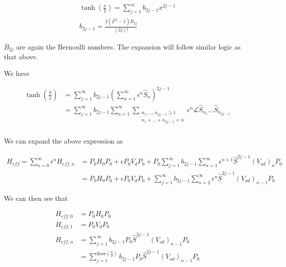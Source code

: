 \documentclass[12pt]{article}
\begin{document}
\begin{equation}
\begin{split}
\tanh\left(\frac{x}{2}\right) = \sum_{j=1}^{\infty} b_{2j-1} x^{2j-1}\\
b_{2j-1} = \frac{2(2^{2j}-1)B_{2j}}{(2j)!}
\end{split}
\end{equation}

$B_{2j}$ are again the Bernoulli numbers. The expansion will follow similar logic as that above.

We have

\begin{equation}
\begin{split}
\tanh\left(\frac{\hat{S}}{2}\right) &= \sum_{j=1}^{\infty} b_{2j-1}\left(\sum_{n=1}^{\infty} \epsilon^n\hat{S}_n \right)^{2j-1}\\
&=\sum_{j=1}^{\infty}b_{2j-1} \sum_{n=1}^{\infty}\sum_{\substack{n_1,\ldots,n_{2j-1}\ge 1\\n_1+\ldots+n_{2j-1}=n}}\epsilon^n \mathcal{L}\hat{S}_{n_1}\ldots \hat{S}_{n_{2j-1}}\\
\end{split}
\end{equation}

We can expand the above expression as

\begin{equation}
\begin{split}
H_{eff} = \sum_{n=0}^{\infty} \epsilon^n H_{eff,n} &=  P_0H_0P_0 + \epsilon P_0V_dP_0 + P_0\sum_{j=1}^{\infty}b_{2j-1}\sum_{n=1}^{\infty}\epsilon^{n+1}\hat{S}^{2j-1}(V_{od})_nP_0\\
&= P_0H_0P_0 + \epsilon P_0V_dP_0 + \sum_{j=1}^{\infty}b_{2j-1}\sum_{n=2}^{\infty} \epsilon^n \hat{S}^{2j-1}(V_{od})_{n-1}P_0
\end{split}
\end{equation}

We can then see that

\begin{equation}
\begin{split}
H_{eff,0} &= P_0H_0P_0\\
H_{eff,1} &= P_0V_dP_0\\
H_{eff,n} &= \sum_{j=1}^{\infty}b_{2j-1} P_0\hat{S}^{2j-1}(V_{od})_{n-1}P_0\\
&= \sum_{j=1}^{\text{floor}\left(\frac{n}{2}\right)} b_{2j-1} P_0 \hat{S}^{2j-1}(V_{od})_{n-1}P_0
\end{split}
\end{equation}
\end{document}
